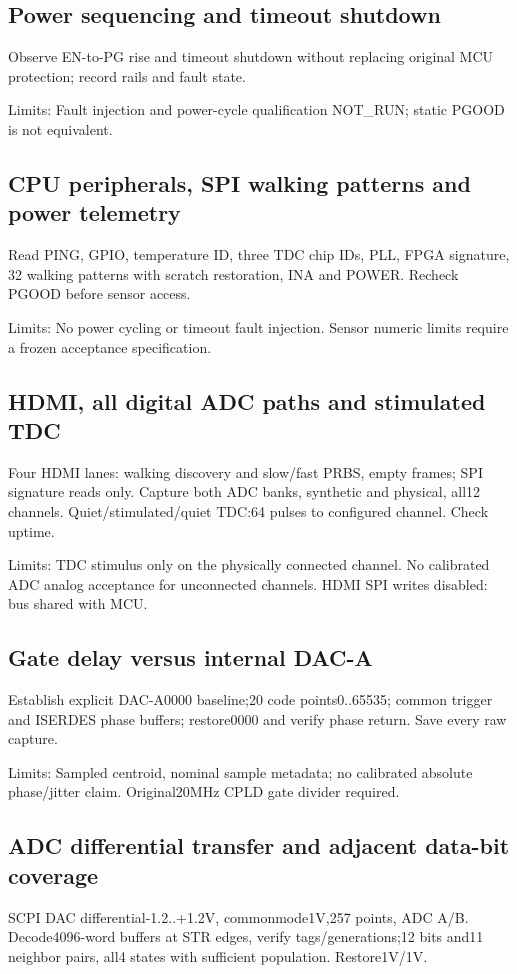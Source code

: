 \subsection{Power sequencing and timeout shutdown}
Observe EN-to-PG rise and timeout shutdown without replacing original MCU protection; record rails and fault state.

Limits: Fault injection and power-cycle qualification NOT\_RUN; static PGOOD is not equivalent.

\subsection{CPU peripherals, SPI walking patterns and power telemetry}
Read PING, GPIO, temperature ID, three TDC chip IDs, PLL, FPGA signature, 32 walking patterns with scratch restoration, INA and POWER. Recheck PGOOD before sensor access.

Limits: No power cycling or timeout fault injection. Sensor numeric limits require a frozen acceptance specification.

\subsection{HDMI, all digital ADC paths and stimulated TDC}
Four HDMI lanes: walking discovery and slow/fast PRBS, empty frames; SPI signature reads only. Capture both ADC banks, synthetic and physical, all12 channels. Quiet/stimulated/quiet TDC:64 pulses to configured channel. Check uptime.

Limits: TDC stimulus only on the physically connected channel. No calibrated ADC analog acceptance for unconnected channels. HDMI SPI writes disabled: bus shared with MCU.

\subsection{Gate delay versus internal DAC-A}
Establish explicit DAC-A0000 baseline;20 code points0..65535; common trigger and ISERDES phase buffers; restore0000 and verify phase return. Save every raw capture.

Limits: Sampled centroid, nominal sample metadata; no calibrated absolute phase/jitter claim. Original20MHz CPLD gate divider required.

\subsection{ADC differential transfer and adjacent data-bit coverage}
SCPI DAC differential-1.2..+1.2V, commonmode1V,257 points, ADC A/B. Decode4096-word buffers at STR edges, verify tags/generations;12 bits and11 neighbor pairs, all4 states with sufficient population. Restore1V/1V.

